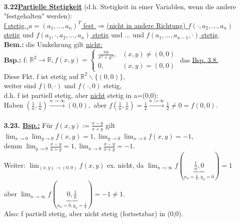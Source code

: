 \documentclass[]{scrartcl}
\begin{document}
\\
\textbf{3.22\ul{Partielle Stetigkeit}} (d.h. Stetigkeit in  
einer Variablen, wenn die andere "festgehalten" werden):\\
\ul{f stetig, $a=(a_1,...,a_n)^T$ fest $\Rightarrow $(nicht 
in andere Richtung) $f(\cdot, a_2,...,a_n)$ stetig} und 
\ul{$f(a_1,\cdot,a_2,...,a_n)$ stetig} und ... und \ul{$f(a_1,...,a_{n-1}, 
\cdot)$ stetig}.\\
\textbf{Bem.:} die Umkehrung gilt \underline{nicht:}\\
\textbf{Bsp.:} f: $\mathbb{R}^2 \rightarrow\mathbb{R}, f(x,y)=\begin{cases}
	\frac{xy}{x^2+y^2}, & (x,y)\neq (0,0)\\
	0, & (x,y) = (0,0)
\end{cases}
$ das \ul{Bsp. 3.8.}\\
Diese Fkt. f ist stetig auf $\mathbb{R}^2\backslash\{(0,0)\}$,\\
weiter sind $f(0,\cdot)$ und $f(\cdot,0)$ stetig,\\
d.h. f ist partiell stetig, aber \underline{nicht} stetig in a=(0,0):\\
Haben $(\frac{1}{n},\frac{1}{n})\xrightarrow{n\rightarrow\infty}(0,0),$ aber 
$f(\frac{1}{n},\frac{1}{n})=\frac{1}{2}\xrightarrow{n\rightarrow 
\infty}\frac{1}{2}\neq0=f(0,0).$\\
\\
\textbf{3.23. \underline{Bsp.:}} Für $f(x,y):=\frac{x-y}{x+y}$ gilt 
$\lim_{x\rightarrow0}\lim_{y\rightarrow0} f(x,y)=1, 
\lim_{y\rightarrow0}\lim_{x\rightarrow0}f(x,y)=-1,$\\
demm $\lim_{y\rightarrow0}\frac{x-y}{x+y}=1, 
\lim_{x\rightarrow0}\frac{x-y}{x+y}=-1.$\\
Weiter: $\lim_{(x,y)\rightarrow(0,0)}f(x,y)$ ex. nicht, da 
$\lim_{n\rightarrow\infty}f(\underbrace{\frac{1}{n},0}_{x_n=\frac{1}{n},y_n=0})=1$\\
aber $\lim_{n\rightarrow\infty} 
f(\underbrace{0,\frac{1}{n}}_{x_n=0,y_n=\frac{1}{n}})=-1\neq1.$\\
Also: f partiell stetig, aber nicht stetig (fortsetzbar) in (0,0).\\
	
	
		
\end{document}
